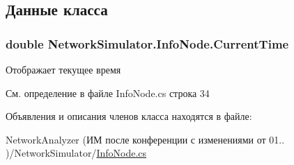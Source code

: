 \subsection{Данные класса}
\subsubsection[{\texorpdfstring{Current\+Time}{CurrentTime}}]{\setlength{\rightskip}{0pt plus 5cm}double Network\+Simulator.\+Info\+Node.\+Current\+Time\hspace{0.3cm}{\ttfamily [private]}}\hypertarget{class_network_simulator_1_1_info_node_a7e608899dfefba1c814626371225d87b}{}\label{class_network_simulator_1_1_info_node_a7e608899dfefba1c814626371225d87b}


Отображает текущее время 



См. определение в файле Info\+Node.\+cs строка 34



Объявления и описания членов класса находятся в файле\+:\begin{DoxyCompactItemize}
\item 
Network\+Analyzer (ИМ после конференции  с изменениями от 01.. )/\+Network\+Simulator/\hyperlink{_info_node_8cs}{Info\+Node.\+cs}\end{DoxyCompactItemize}
